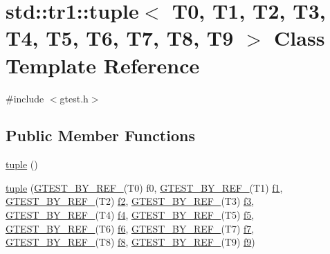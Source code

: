 \hypertarget{classstd_1_1tr1_1_1tuple}{\section{std\-:\-:tr1\-:\-:tuple$<$ T0, T1, T2, T3, T4, T5, T6, T7, T8, T9 $>$ Class Template Reference}
\label{classstd_1_1tr1_1_1tuple}
}


{\ttfamily \#include $<$gtest.\-h$>$}

\subsection*{Public Member Functions}
\begin{DoxyCompactItemize}
\item 
\hyperlink{classstd_1_1tr1_1_1tuple_a3fb03a675507fb251c755634d9002a98}{tuple} ()
\item 
\hyperlink{classstd_1_1tr1_1_1tuple_a5c31ee8e6f548fc37ef814d3db7d273f}{tuple} (\hyperlink{namespacestd_1_1tr1_a7c131d0c2462612a78012be16114f61d}{G\-T\-E\-S\-T\-\_\-\-B\-Y\-\_\-\-R\-E\-F\-\_\-}(T0) f0, \hyperlink{namespacestd_1_1tr1_a7c131d0c2462612a78012be16114f61d}{G\-T\-E\-S\-T\-\_\-\-B\-Y\-\_\-\-R\-E\-F\-\_\-}(T1) \hyperlink{namespacestd_1_1tr1_a9c0fa65b105f8e2f58ba59ecf75fd000}{f1}, \hyperlink{namespacestd_1_1tr1_a7c131d0c2462612a78012be16114f61d}{G\-T\-E\-S\-T\-\_\-\-B\-Y\-\_\-\-R\-E\-F\-\_\-}(T2) \hyperlink{namespacestd_1_1tr1_a87dd9e009868361317f587126dba63d4}{f2}, \hyperlink{namespacestd_1_1tr1_a7c131d0c2462612a78012be16114f61d}{G\-T\-E\-S\-T\-\_\-\-B\-Y\-\_\-\-R\-E\-F\-\_\-}(T3) \hyperlink{namespacestd_1_1tr1_a0f7c3b47d27d42d82d1a333ea420ce4e}{f3}, \hyperlink{namespacestd_1_1tr1_a7c131d0c2462612a78012be16114f61d}{G\-T\-E\-S\-T\-\_\-\-B\-Y\-\_\-\-R\-E\-F\-\_\-}(T4) \hyperlink{namespacestd_1_1tr1_adc796e02b7385d526aff708189564f67}{f4}, \hyperlink{namespacestd_1_1tr1_a7c131d0c2462612a78012be16114f61d}{G\-T\-E\-S\-T\-\_\-\-B\-Y\-\_\-\-R\-E\-F\-\_\-}(T5) \hyperlink{namespacestd_1_1tr1_a9c1eb66b2b2fa321942af95405232a0d}{f5}, \hyperlink{namespacestd_1_1tr1_a7c131d0c2462612a78012be16114f61d}{G\-T\-E\-S\-T\-\_\-\-B\-Y\-\_\-\-R\-E\-F\-\_\-}(T6) \hyperlink{namespacestd_1_1tr1_a6b62f32e1e3e21bceb94eb46c4cbfd56}{f6}, \hyperlink{namespacestd_1_1tr1_a7c131d0c2462612a78012be16114f61d}{G\-T\-E\-S\-T\-\_\-\-B\-Y\-\_\-\-R\-E\-F\-\_\-}(T7) \hyperlink{namespacestd_1_1tr1_a2185f3a1c07f2df072c39cb91ffa89a4}{f7}, \hyperlink{namespacestd_1_1tr1_a7c131d0c2462612a78012be16114f61d}{G\-T\-E\-S\-T\-\_\-\-B\-Y\-\_\-\-R\-E\-F\-\_\-}(T8) \hyperlink{namespacestd_1_1tr1_ab998afa41cea8d6d26d7e4288b0bf974}{f8}, \hyperlink{namespacestd_1_1tr1_a7c131d0c2462612a78012be16114f61d}{G\-T\-E\-S\-T\-\_\-\-B\-Y\-\_\-\-R\-E\-F\-\_\-}(T9) \hyperlink{namespacestd_1_1tr1_a5a31905861d0f793ee32942d6e3f5d72}{f9})

\end{DoxyCompactItemize}
